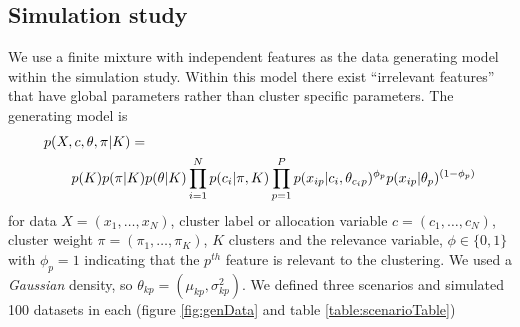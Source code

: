 \documentclass{bmcart}
\begin{document}
\subsection*{Simulation study}

We use a finite mixture with independent features as the data generating model within the simulation study.
Within this model there exist ``irrelevant features'' \citep{law2003feature} that have global parameters rather than cluster specific parameters. 
The generating model is
\begin{align} 
    p(X, c, \theta, \pi| K) =& \notag\\
    p(K) p(\pi|K) &p(\theta|K) \prod_{i=1}^N p (c_i | \pi, K)  \prod_{p=1}^P p(x_{ip} | c_i, \theta_{c_ip})^ {\phi_p} p(x_{ip} | \theta_p) ^ {(1 - \phi_p)}\label{eqn:simGenModel}
\end{align}
for data $X=(x_1, \ldots, x_N)$, cluster label or allocation variable $c=(c_1, \ldots, c_N)$, cluster weight $\pi=(\pi_1, \ldots, \pi_K)$, $K$ clusters and the relevance variable, $\phi \in \{0, 1\}$ with $\phi_p=1$ indicating that the $p^{th}$ feature is relevant to the clustering. We used a \emph{Gaussian} density, so $\theta_{kp} = (\mu_{kp}, \sigma^2_{kp})$. We defined three scenarios and simulated 100 datasets in each (figure \ref{fig:genData} and table \ref{table:scenarioTable}) 
\end{document}
